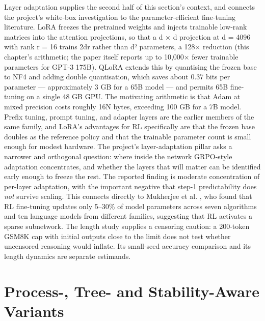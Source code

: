 \documentclass[12pt,a4paper]{report}
\begin{document}
Layer adaptation supplies the second half of this section's context, and
connects the project's white-box investigation to the
parameter-efficient fine-tuning literature. LoRA \citep{hu2021lora}
freezes the pretrained weights and injects trainable low-rank matrices
into the attention projections, so that a d × d projection at d = 4096
with rank r = 16 trains 2dr rather than d² parameters, a 128× reduction
(this chapter's arithmetic; the paper itself reports up to 10,000× fewer
trainable parameters for GPT-3 175B). QLoRA \citep{dettmers2023qlora}
extends this by quantising the frozen base to NF4 and adding double
quantisation, which saves about 0.37 bits per parameter ---
approximately 3 GB for a 65B model --- and permits 65B fine-tuning on a
single 48 GB GPU. The motivating arithmetic is that Adam at mixed
precision costs roughly 16N bytes, exceeding 100 GB for a 7B model.
Prefix tuning, prompt tuning, and adapter layers are the earlier members
of the same family, and LoRA's advantages for RL specifically are that
the frozen base doubles as the reference policy and that the trainable
parameter count is small enough for modest hardware. The project's
layer-adaptation pillar asks a narrower and orthogonal question: where
inside the network GRPO-style adaptation concentrates, and whether the
layers that will matter can be identified early enough to freeze the
rest. The reported finding is moderate concentration of per-layer
adaptation, with the important negative that step-1 predictability does
\emph{not} survive scaling. This connects directly to Mukherjee et al.
\citep{mukherjee2025rlsubnetworks}, who found that RL fine-tuning
updates only 5--30\% of model parameters across seven algorithms and ten
language models from different families, suggesting that RL activates a
sparse subnetwork. The length study supplies a censoring caution: a
200-token GSM8K cap with initial outputs close to the limit does not
test whether uncensored reasoning would inflate. Its small-seed accuracy
comparison and its length dynamics are separate estimands.

\section{Process-, Tree- and Stability-Aware
Variants}\label{process--tree--and-stability-aware-variants}
\end{document}
